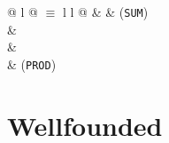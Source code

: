 \begin{isabellebody}
\begin{isamarkuptext}
\begin{supertabular}{@ {} l @ {\quad$\equiv$\quad} l l @ {}}
 &  & (\verb$SUM$)\\
 & \\
 & \\
 & (\verb$PROD$)\\
\end{supertabular}


\section{Wellfounded}


\end{isamarkuptext}
\end{isabellebody}
